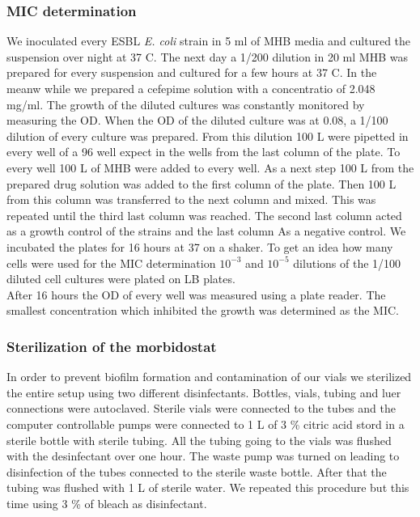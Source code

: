 \subsubsection{MIC determination}
We inoculated every ESBL \textit{E. coli} strain in 5 ml of MHB media and cultured the suspension over night at 37 \degree C. The next day a 1/200 dilution in 20 ml MHB was prepared for every suspension and cultured for a few hours at 37 \degree C. In the meanw while we prepared a cefepime solution with a concentratio of 2.048 mg/ml. The growth of the diluted cultures was constantly monitored by measuring the OD. When the OD of the diluted culture was at 0.08, a 1/100 dilution of every culture was prepared. From this dilution 100 \textmu L were pipetted in every well of a 96 well expect in the wells from the last column of the plate. To every well 100 \textmu L of MHB were added to every well. As a next step 100 \textmu L from the prepared drug solution was added to the first column of the plate. Then 100 \textmu L from this column was transferred to the next column and mixed. This was repeated until the third last column was reached. The second last column acted as a growth control of the strains and the last column As a negative control. We incubated the plates for 16 hours at 37 \degree \space on a shaker. To get an idea how many cells were used for the MIC determination $10^{-3}$ and $10^{-5}$ dilutions of the 1/100 diluted cell cultures were plated on LB plates.\\
After 16 hours the OD of every well was measured using a plate reader. The smallest concentration which inhibited the growth was determined as the MIC. 
\label{section:mic_determination}

\subsubsection{Sterilization of the morbidostat}
In order to prevent biofilm formation and contamination of our vials we sterilized the entire setup using two different disinfectants.
Bottles, vials, tubing and luer connections were autoclaved. Sterile vials were connected to the tubes and the computer controllable pumps were connected to 1 L of 3 \% citric acid stord in a sterile bottle with sterile tubing. All the tubing going to the vials was flushed with the desinfectant over one hour. The waste pump was turned on leading to disinfection of the tubes connected to the sterile waste bottle. After that the tubing was flushed with 1 L of sterile water. We repeated this procedure but this time using 3 \% of bleach as disinfectant.
\label{section:sterilization}


